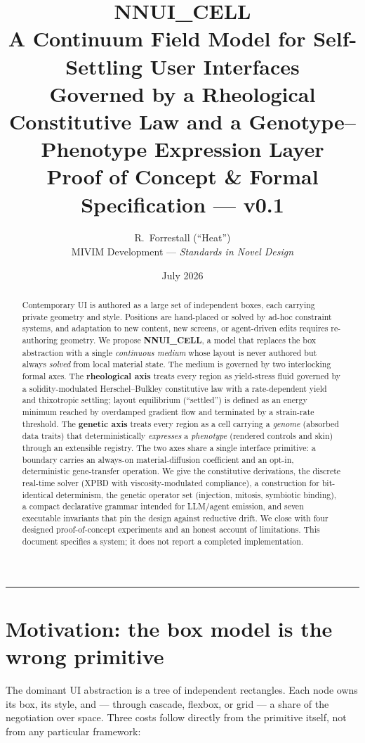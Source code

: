 \documentclass[11pt]{article}
\title{\vspace{-2em}\textbf{NNUI\_CELL}\\[0.3em]
\large A Continuum Field Model for Self-Settling User Interfaces\\
\large Governed by a Rheological Constitutive Law and a Genotype--Phenotype Expression Layer\\[0.6em]
\normalsize Proof of Concept \& Formal Specification --- v0.1}
\author{R.~Forrestall (``Heat'')\\ \normalsize MIVIM Development --- \textit{Standards in Novel Design}}
\date{July 2026}
\begin{document}
\maketitle

\begin{abstract}
\noindent
Contemporary UI is authored as a large set of independent boxes, each carrying private
geometry and style. Positions are hand-placed or solved by ad-hoc constraint systems, and
adaptation to new content, new screens, or agent-driven edits requires re-authoring geometry.
We propose \textbf{NNUI\_CELL}, a model that replaces the box abstraction with a single
\emph{continuous medium} whose layout is never authored but always \emph{solved} from local
material state. The medium is governed by two interlocking formal axes. The
\textbf{rheological axis} treats every region as yield-stress fluid governed by a
solidity-modulated Herschel--Bulkley constitutive law with a rate-dependent yield and
thixotropic settling; layout equilibrium (``settled'') is defined as an energy minimum reached
by overdamped gradient flow and terminated by a strain-rate threshold. The \textbf{genetic
axis} treats every region as a cell carrying a \emph{genome} (absorbed data traits) that
deterministically \emph{expresses} a \emph{phenotype} (rendered controls and skin) through an
extensible registry. The two axes share a single interface primitive: a boundary carries an
always-on material-diffusion coefficient and an opt-in, deterministic gene-transfer operation.
We give the constitutive derivations, the discrete real-time solver (XPBD with
viscosity-modulated compliance), a construction for bit-identical determinism, the genetic
operator set (injection, mitosis, symbiotic binding), a compact declarative grammar intended
for LLM/agent emission, and seven executable invariants that pin the design against
reductive drift. We close with four designed proof-of-concept experiments and an honest
account of limitations. This document specifies a system; it does not report a completed
implementation.
\end{abstract}

\noindent\textcolor{rule}{\rule{\linewidth}{0.8pt}}

\section{Motivation: the box model is the wrong primitive}

The dominant UI abstraction is a tree of independent rectangles. Each node owns its box, its
style, and --- through cascade, flexbox, or grid --- a share of the negotiation over space.
Three costs follow directly from the primitive itself, not from any particular framework:
\end{document}
